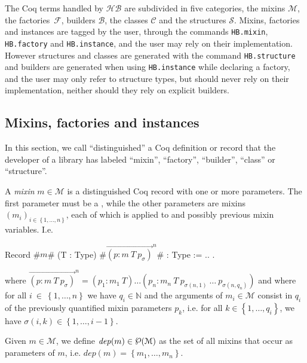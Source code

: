 \documentclass[a4paper,UKenglish,cleveref, autoref]{lipics-v2019}
\newcommand{\HB}{\ensuremath{\mathcal{HB}}}
\newcommand{\mixin}{mixin}
\newcommand{\mixins}{mixins}
\newcommand{\Mixins}{Mixins}
\newcommand{\M}{\ensuremath{\mathcal{M}}}
\newcommand{\factory}{factory}
\newcommand{\factories}{factories}
\newcommand{\mixinbuilder}{builder}
\newcommand{\mixinbuilders}{builders}
\newcommand{\F}{\ensuremath{\mathcal{F}}}
\newcommand{\dep}{\ensuremath{\mathit{dep}}}
\newcommand{\powerset}[1]{\raisebox{.15\baselineskip}{\Large\ensuremath{\wp}}(#1)}
\newcommand{\C}{\ensuremath{\mathcal{C}}}
\newcommand{\B}{\ensuremath{\mathcal{B}}}
\newcommand{\class}{class}
\newcommand{\classes}{classes}
\newcommand{\Str}{\ensuremath{\mathcal{S}}}
\newcommand{\structure}{structure}
\newcommand{\structures}{structures}
\newcommand{\set}[1]{\left\{#1\right\}}
\newcommand{\enum}[2]{\ensuremath{\set{#1,\ldots,#2}}}
\newcommand{\vect}[1]{\overrightarrow{#1}}
\newcommand{\pmp}[1]{\ensuremath{\vect{\left(p : m\ T\ p_\sigma\right)}^{#1}}}
\newcommand{\hbmixin}{{\tt\color{dkgreen}HB.mixin}}
\newcommand{\hbfactory}{{\tt\color{dkgreen}HB.factory}}
\newcommand{\hbinstance}{{\tt\color{dkgreen}HB.instance}}
\newcommand{\hbstructure}{{\tt\color{dkgreen}HB.structure}}
\theoremstyle{implem}
\theoremstyle{implem}
\theoremstyle{command}
\theoremstyle{commands}
\begin{document}
The Coq terms handled by \HB{} are subdivided in five categories, the
\mixins{} \(\M{}\), the \factories{}~\(\F{}\), \mixinbuilders{}
\(\B{}\), the \classes{} \(\C{}\) and the \structures{}
\(\Str{}\). \Mixins{}, \factories{} and instances are tagged by the
user, through the commands \hbmixin{}, \hbfactory{} and \hbinstance{},
and the user may rely on their implementation. However structures and
classes are generated with the command \hbstructure{} and builders are
generated when using \hbinstance{} while declaring a \factory{}, and
the user may only refer to structure types, but should never rely on
their implementation, neither should they rely on explicit builders.

\subsection{\Mixins{}, \factories{} and instances}
\label{sec:hb-mixins-factories}

In this section, we call ``distinguished'' a Coq definition or record
that the developer of a library has labeled ``\mixin{}'', ``\factory{}'',
``\mixinbuilder{}'', ``\class{}'' or ``\structure{}''.

\begin{definition}[\M{}, \mixins{}]
  A \emph{\mixin{}} \(m \in \M{}\) is a distinguished Coq record with one or more
  parameters.  The first parameter must be a , while
  the other parameters are \mixins{} \(\left(m_i\right)_{i \in \enum1n}\), each of which
  is applied to  and possibly previous mixin variables. I.e.
\begin{coqcode}
Record #$m$# (T : Type) #\(\pmp{n}\)# : Type := { .. }.
\end{coqcode}
where \(\pmp{n} = (p_1 : m_1\ T) \ldots \left(p_n : m_n\ T\ p_{\sigma(n,1)}\ \ldots\ p_{\sigma(n,q_n)}\right)\)
and where for all \(i~\in~\enum1n\) we have \(q_i \in \mathbb{N}\) and the
arguments of \(m_i \in \M{}\) consist in $q_i$ of the previously quantified
mixin parameters $p_k$, i.e. for all \(k \in \enum1{q_i}\), we
have \(\sigma(i,k) \in \enum1{i-1}\).
\end{definition}

\begin{definition}[\dep{}, \mixin{} dependencies]
  Given \(m \in \M{}\), we define \(\dep{}(m) \in \powerset\M{}\)
  as the set of all \mixins{} that occur as parameters of \(m\), i.e.
  \(\dep{}(m) = \enum{m_1}{m_n}\).
\end{definition}
\end{document}

